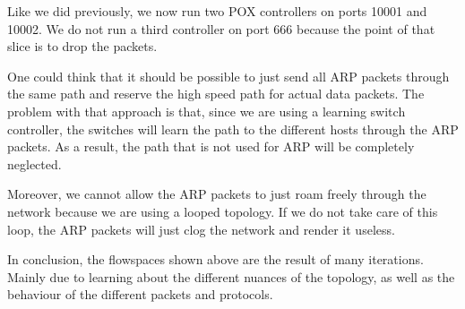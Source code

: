 Like we did previously, we now run two POX controllers on ports 10001 and 10002. We do not run a third controller on port 666 because the point of that slice is to drop the packets.

One could think that it should be possible to just send all ARP packets through the same path and reserve the high speed path for actual data packets. The problem with that approach is that, since we are using a learning switch controller, the switches will learn the path to the different hosts through the ARP packets. As a result, the path that is not used for ARP will be completely neglected.

Moreover, we cannot allow the ARP packets to just roam freely through the network because we are using a looped topology. If we do not take care of this loop, the ARP packets will just clog the network and render it useless. 

In conclusion, the flowspaces shown above are the result of many iterations. Mainly due to learning about the different nuances of the topology, as well as the behaviour of the different packets and protocols.

